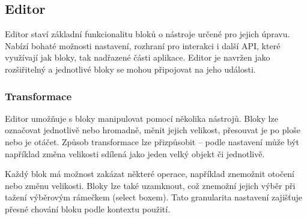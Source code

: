 \subsection{Editor}

Editor staví základní funkcionalitu bloků o nástroje určené pro jejich úpravu. 
Nabízí bohaté možnosti nastavení, rozhraní pro interakci i další API, které využívají jak bloky, tak nadřazené části aplikace.
Editor je navržen jako rozšiřitelný a jednotlivé bloky se mohou připojovat na jeho události.

\subsubsection{Transformace}

Editor umožňuje s bloky manipulovat pomocí několika nástrojů. 
Bloky lze označovat jednotlivě nebo hromadně, měnit jejich velikost, přesouvat je po ploše nebo je otáčet. 
Způsob transformace lze přizpůsobit -- podle nastavení může být například změna velikosti sdílená jako jeden velký objekt či jednotlivě.

Každý blok má možnost zakázat některé operace, například znemožnit otočení nebo změnu velikosti. 
Bloky lze také uzamknout, což znemožní jejich výběr při tažení výběrovým rámečkem (select boxem). 
Tato granularita nastavení zajišťuje přesné chování bloku podle kontextu použití.







